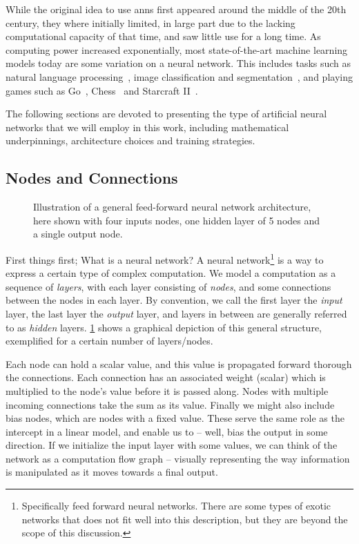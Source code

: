 \documentclass[Thesis.tex]{subfiles}
\begin{document}
While the original idea to use \glspl{ann} first appeared around the middle of the 20th
century, they where initially limited, in large part due to the lacking
computational capacity of that time, and saw little use for a long time. As
computing power increased exponentially, most state-of-the-art
machine learning models today are some variation on a neural network. This
includes tasks such as natural language processing~\cite{bert-2018}, image classification and
segmentation~\cite{gpipe-2018}, and playing games such as Go~\cite{deepmind-alpha-go-zero},
Chess~\cite{deepmind-alpha-zero} and Starcraft II~\cite{vinyals_babuschkin_chung_mathieu_2019}.

The following sections are devoted to presenting the type of artificial neural
networks that we will employ in this work, including mathematical underpinnings,
architecture choices and training strategies.

\subsection{Nodes and Connections}

\begin{figure}[h]
  \centering
  
  \caption[Illustration of an artificial neural network]{Illustration of a general feed-forward neural network architecture,
    here shown with four inputs nodes, one hidden layer of 5 nodes and a
    single output node.}
  \label{fig:neural-network-example-diagram}
\end{figure}

First things first; What is a neural network? A neural
network\footnote{Specifically feed forward neural networks. There are some types
of exotic networks that does not fit well into this description, but they are
beyond the scope of this discussion.} is a way to express a certain type of
complex computation. We model a computation as a sequence of \emph{layers}, with
each layer consisting of \emph{nodes}, and some connections between the nodes in
each layer. By convention, we call the first layer the \emph{input} layer, the
last layer the \emph{output} layer, and layers in between are
generally referred to as \emph{hidden} layers.
\cref{fig:neural-network-example-diagram} shows a graphical depiction of this
general structure, exemplified for a certain number of layers/nodes.

Each node can hold a scalar value, and this value is propagated forward thorough
the connections. Each connection has an associated weight (scalar) which is
multiplied to the node's value before it is passed along. Nodes with multiple
incoming connections take the sum as its value. Finally we might also include
bias nodes, which are nodes with a fixed value. These serve the same role as the
intercept in a linear model, and enable us to -- well, bias the output in some
direction. If we initialize the input layer with some values, we can think of
the network as a computation flow graph -- visually representing the way
information is manipulated as it moves towards a final output.
\end{document}
